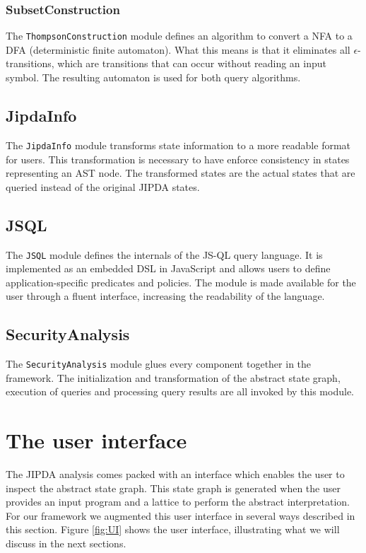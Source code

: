 \subsubsection*{SubsetConstruction}
The \texttt{ThompsonConstruction} module defines an algorithm to convert a NFA to a DFA (deterministic finite automaton). What this means is that it eliminates all $\epsilon$-transitions, which are transitions that can occur without reading an input symbol. The resulting automaton is used for both query algorithms.

\subsection*{JipdaInfo}
The \texttt{JipdaInfo} module transforms state information to a more readable format for users. This transformation is necessary to have enforce consistency in states representing an AST node. The transformed states are the actual states that are queried instead of the original JIPDA states.

\subsection*{JSQL}
The \texttt{JSQL} module defines the internals of the JS-QL query language. It is implemented as an embedded DSL in JavaScript and allows users to define application-specific predicates and policies. The module is made available for the user through a fluent interface, increasing the readability of the language.

\subsection*{SecurityAnalysis}
The \texttt{SecurityAnalysis} module glues every component together in the framework. The initialization and transformation of the abstract state graph, execution of queries and processing query results are all invoked by this module.

\section{The user interface}
The JIPDA analysis comes packed with an interface which enables the user to inspect the abstract state graph. This state graph is generated when the user provides an input program and a lattice to perform the abstract interpretation. For our framework we augmented this user interface in several ways described in this section. Figure \ref{fig:UI} shows the user interface, illustrating what we will discuss in the next sections.


